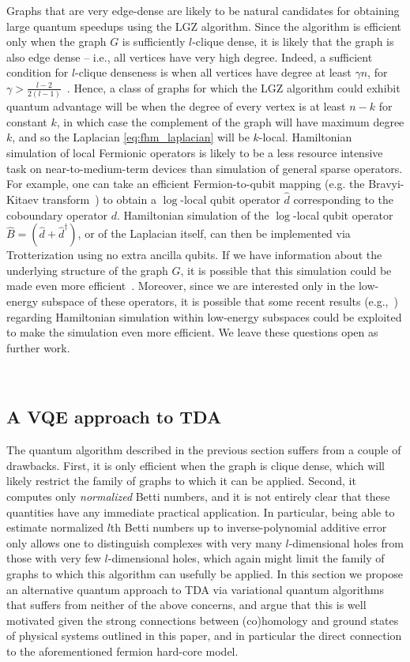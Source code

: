 \documentclass[11pt]{article}
\numberwithin{equation}{section}
\renewcommand\( {\left(}
\renewcommand\) {\right)}
\begin{document}
Graphs that are very edge-dense are likely to be natural candidates for obtaining large quantum speedups using the LGZ algorithm. Since the algorithm is efficient only when the graph $G$ is sufficiently $l$-clique dense, it is likely that the graph is also edge dense -- i.e., all vertices have very high degree. Indeed, a sufficient condition for $l$-clique denseness is when all vertices have degree at least $\gamma n$, for $\gamma > \frac{l-2}{2(l-1)}$~\cite{reiher2016clique}. Hence, a class of graphs for which the LGZ algorithm could exhibit quantum advantage will be when the degree of every vertex is at least $n-k$ for constant $k$, in which case the complement of the graph will have maximum degree $k$, and so the Laplacian \eqref{eq:fhm_laplacian} will be $k$-local. Hamiltonian simulation of local Fermionic operators is likely to be a less resource intensive task on near-to-medium-term devices than simulation of general sparse operators. For example, one can take an efficient Fermion-to-qubit mapping (e.g. the Bravyi-Kitaev transform~\cite{bravyi2002fermionic}) to obtain a $\log$-local qubit operator $\hat{d}$ corresponding to the coboundary operator $d$. Hamiltonian simulation of the $\log$-local qubit operator $\hat{B} = (\hat{d} + \hat{d}^\dagger)$, or of the Laplacian itself, can then be implemented via Trotterization using no extra ancilla qubits. If we have information about the underlying structure of the graph $G$, it is possible that this simulation could be made even more efficient~\cite{childs2019theory}. Moreover, since we are interested only in the low-energy subspace of these operators, it is possible that some recent results (e.g.,~\cite{sahinogluhamiltonian}) regarding Hamiltonian simulation within low-energy subspaces could be exploited to make the simulation even more efficient. We leave these questions open as further work.

\ 



\subsection{A VQE approach to TDA}\label{sec:variational_TDA}
The quantum algorithm described in the previous section suffers from a couple of drawbacks. First, it is only efficient when the graph is clique dense, which will likely restrict the family of graphs to which it can be applied. Second, it computes only \emph{normalized} Betti numbers, and it is not entirely clear that these quantities have any immediate practical application. In particular, being able to estimate normalized $l$th Betti numbers up to inverse-polynomial additive error only allows one to distinguish complexes with very many $l$-dimensional holes from those with very few $l$-dimensional holes, which again might limit the family of graphs to which this algorithm can usefully be applied. In this section we propose an alternative quantum approach to TDA via variational quantum algorithms that suffers from neither of the above concerns, and argue that this is well motivated given the strong connections between (co)homology and ground states of physical systems outlined in this paper, and in particular the direct connection to the aforementioned fermion hard-core model.
\end{document}
